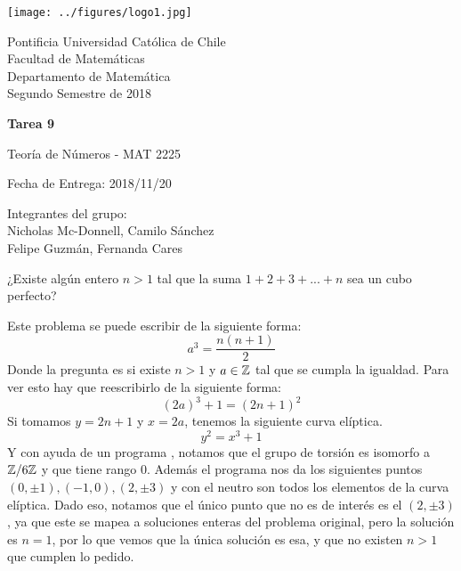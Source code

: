 


\begin{minipage}{2.5cm}
	\texttt{[image: ../figures/logo1.jpg]}
\end{minipage}
\begin{minipage}{13cm}
	\begin{flushleft}
		\raggedright
		{
			\noindent
			{\sc Pontificia Universidad Católica de Chile\\
				Facultad de Matemáticas\\
				Departamento de Matemática} \smallskip \\
			Segundo Semestre de 2018\\
		}
	\end{flushleft}
\end{minipage}

\vspace{2ex}
{\Large \centerline{\bf Tarea 9}}
{\large \centerline{Teoría de Números - MAT 2225}}
\centerline{Fecha de Entrega: 2018/11/20}

\begin{flushright}
	Integrantes del grupo:\\
	Nicholas Mc-Donnell, Camilo Sánchez\\
	Felipe Guzmán, Fernanda Cares
\end{flushright}

\begin{prob}[10 pts.]
	¿Existe algún entero $n>1$ tal que la suma $1+2+3+...+n$ sea un cubo perfecto?
\end{prob}

\begin{sol}
	Este problema se puede escribir de la siguiente forma:
	\[
		a^3=\frac{n(n+1)}2
	\]
	Donde la pregunta es si existe $n>1$ y $a\in\mathbb{Z}$ tal que se cumpla la igualdad. Para ver esto hay que reescribirlo de la siguiente forma:
	\[
		(2a)^3+1=(2n+1)^2
	\]
	Si tomamos $y=2n+1$ y $x=2a$, tenemos la siguiente curva elíptica.
	\[
		y^2=x^3+1
	\]
	Y con ayuda de un programa \citep{prog}, notamos que el grupo de torsión es isomorfo a $\mathbb{Z}/6\mathbb{Z}$  y que tiene rango $0$. Además el programa nos da los siguientes puntos $(0,\pm1),(-1,0),(2,\pm3)$ y con el neutro son todos los elementos de la curva elíptica. Dado eso, notamos que el único punto que no es de interés es el $(2,\pm 3)$, ya que este se mapea a soluciones enteras del problema original, pero la solución es $n=1$, por lo que vemos que la única solución es esa, y que no existen $n>1$ que cumplen lo pedido.
\end{sol}

